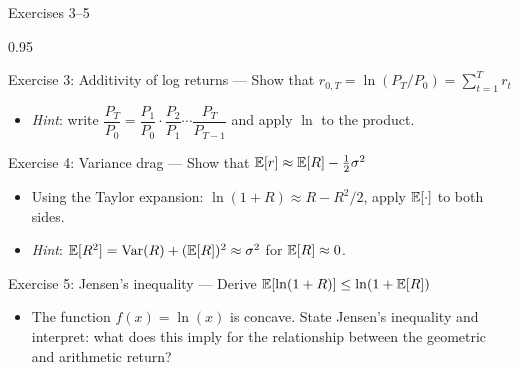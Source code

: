 \documentclass[9pt, aspectratio=169, t]{beamer}
\begin{document}
\begin{frame}[shrink=7]{Exercises 3--5}
    \begin{cminipage}{0.95\textwidth}
    \begin{block}{Exercise 3: Additivity of log returns --- Show that $r_{0,T} = \ln(P_T/P_0) = \sum_{t=1}^{T} r_t$}
    \begin{itemize}\setlength{\itemsep}{0pt}
        \item \textit{Hint}: write $\dfrac{P_T}{P_0} = \dfrac{P_1}{P_0} \cdot \dfrac{P_2}{P_1} \cdots \dfrac{P_T}{P_{T-1}}$ and apply $\ln$ to the product.
    \end{itemize}
    \end{block}
    \vspace{0.2cm}
    \begin{block}{Exercise 4: Variance drag --- Show that $\mathbb{E}[r] \approx \mathbb{E}[R] - \frac{1}{2}\sigma^2$}
    \begin{itemize}\setlength{\itemsep}{0pt}
        \item Using the Taylor expansion: $\ln(1+R) \approx R - R^2/2$, apply $\mathbb{E}[\cdot]$ to both sides.
        \item \textit{Hint}: $\mathbb{E}[R^2] = \text{Var}(R) + (\mathbb{E}[R])^2 \approx \sigma^2$ for $\mathbb{E}[R] \approx 0$.
    \end{itemize}
    \end{block}
    \vspace{0.2cm}
    \begin{exampleblock}{Exercise 5: Jensen's inequality --- Derive $\mathbb{E}[\ln(1+R)] \leq \ln(1 + \mathbb{E}[R])$}
    \begin{itemize}\setlength{\itemsep}{0pt}
        \item The function $f(x) = \ln(x)$ is concave. State Jensen's inequality and interpret: what does this imply for the relationship between the geometric and arithmetic return?
    \end{itemize}
    \end{exampleblock}
    \end{cminipage}
\end{frame}
\end{document}
